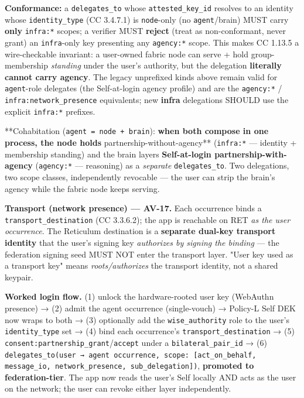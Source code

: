 \documentclass[11pt]{article}
\begin{document}
\textbf{Conformance:} a \texttt{delegates\_to} whose \texttt{attested\_key\_id} resolves to an identity whose \texttt{identity\_type} (CC 3.4.7.1) is \texttt{node}-only (no \texttt{agent}/brain) MUST carry \textbf{only} \texttt{infra:*} scopes; a verifier MUST \textbf{reject} (treat as non-conformant, never grant) an \texttt{infra}-only key presenting any \texttt{agency:*} scope. This makes CC 1.13.5 a wire-checkable invariant: a user-owned fabric node can serve + hold group-membership \textit{standing} under the user's authority, but the delegation \textbf{literally cannot carry agency}. The legacy unprefixed kinds above remain valid for \texttt{agent}-role delegates (the Self-at-login agency profile) and are the \texttt{agency:*} / \texttt{infra:network\_presence} equivalents; new \textbf{infra} delegations SHOULD use the explicit \texttt{infra:*} prefixes.


**Cohabitation (\texttt{agent = node + brain}):\textbf{ when both compose in one process, the node holds }partnership-without-agency** (\texttt{infra:*} — identity + membership standing) and the brain layers \textbf{Self-at-login partnership-with-agency} (\texttt{agency:*} — reasoning) as a \textit{separate} \texttt{delegates\_to}. Two delegations, two scope classes, independently revocable — the user can strip the brain's agency while the fabric node keeps serving.


\textbf{Transport (network presence) — AV-17.} Each occurrence binds a \texttt{transport\_destination} (CC 3.3.6.2); the app is reachable on RET \textit{as the user occurrence}. The Reticulum destination is a \textbf{separate dual-key transport identity} that the user's signing key \textit{authorizes by signing the binding} — the federation signing seed MUST NOT enter the transport layer. "User key used as a transport key" means \textit{roots/authorizes} the transport identity, not a shared keypair.


\textbf{Worked login flow.} (1) unlock the hardware-rooted user key (WebAuthn presence) → (2) admit the agent occurrence (single-vouch) → Policy-L Self DEK now wraps to both → (3) optionally add the \texttt{wise\_authority} role to the user's \texttt{identity\_type} set → (4) bind each occurrence's \texttt{transport\_destination} → (5) \texttt{consent:partnership\_grant}/\texttt{accept} under a \texttt{bilateral\_pair\_id} → (6) \texttt{delegates\_to(user → agent occurrence, scope: [act\_on\_behalf, message\_io, network\_presence, sub\_delegation])}, \textbf{promoted to federation-tier}. The app now reads the user's Self locally AND acts as the user on the network; the user can revoke either layer independently.
\end{document}
